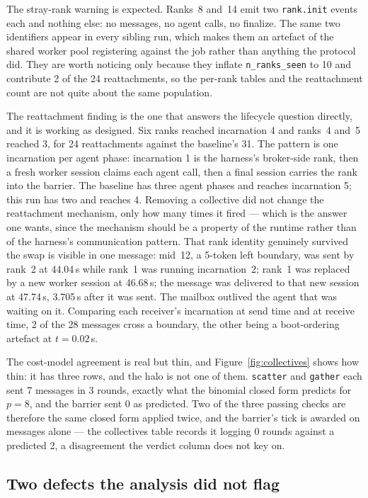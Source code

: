 \documentclass[11pt]{article}
\begin{document}
The stray-rank warning is expected. Ranks~8 and~14 emit two \texttt{rank.init} events each and
nothing else: no messages, no agent calls, no finalize. The same two identifiers appear in every
sibling run, which makes them an artefact of the shared worker pool registering against the job
rather than anything the protocol did. They are worth noticing only because they inflate
\texttt{n\_ranks\_seen} to 10 and contribute 2 of the 24 reattachments, so the per-rank tables and
the reattachment count are not quite about the same population.

The reattachment finding is the one that answers the lifecycle question directly, and it is
working as designed. Six ranks reached incarnation 4 and ranks~4 and~5 reached 3, for 24
reattachments against the baseline's 31. The pattern is one incarnation per agent phase:
incarnation 1 is the harness's broker-side rank, then a fresh worker session claims each agent
call, then a final session carries the rank into the barrier. The baseline has three agent phases
and reaches incarnation 5; this run has two and reaches 4. Removing a collective did not change
the reattachment mechanism, only how many times it fired --- which is the answer one wants, since
the mechanism should be a property of the runtime rather than of the harness's communication
pattern. That rank identity genuinely survived the swap is visible in one message: mid~12, a
5-token left boundary, was sent by rank~2 at 44.04\,s while rank~1 was running incarnation~2;
rank~1 was replaced by a new worker session at 46.68\,s; the message was delivered to that new
session at 47.74\,s, 3.705\,s after it was sent. The mailbox outlived the agent that was waiting on
it. Comparing each receiver's incarnation at send time and at receive time, 2 of the 28 messages
cross a boundary, the other being a boot-ordering artefact at $t = 0.02$\,s.

The cost-model agreement is real but thin, and Figure~\ref{fig:collectives} shows how thin: it has
three rows, and the halo is not one of them. \texttt{scatter} and \texttt{gather} each sent 7
messages in 3 rounds, exactly what the binomial closed form predicts for $p = 8$, and the barrier
sent 0 as predicted. Two of the three passing checks are therefore the same closed form applied
twice, and the barrier's tick is awarded on messages alone --- the collectives table records it
logging 0 rounds against a predicted 2, a disagreement the verdict column does not key on.

\subsection*{Two defects the analysis did not flag}
\end{document}
